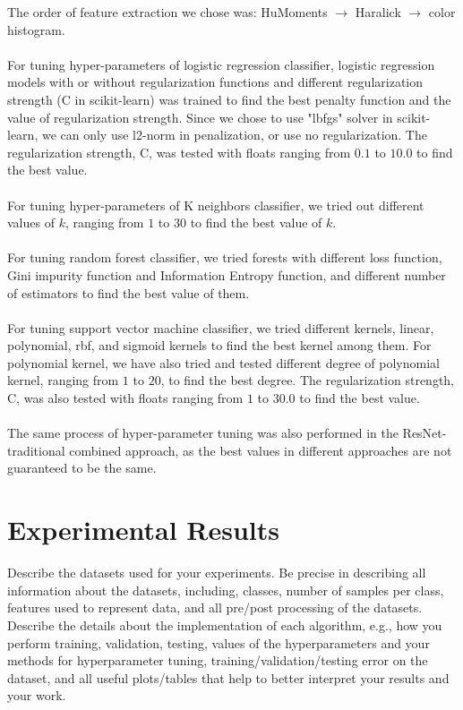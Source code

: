 \documentclass[11.5pt]{article}
\begin{document}
The order of feature extraction we chose was: HuMoments $\rightarrow$ Haralick $\rightarrow$ color histogram.\\ \\
For tuning hyper-parameters of logistic regression classifier, logistic regression models with or without regularization functions and different regularization strength (C in scikit-learn) was trained to find the best penalty function and the value of regularization strength.
Since we chose to use "lbfgs" solver in scikit-learn, we can only use l2-norm in penalization, or use no regularization.
The regularization strength, C, was tested with floats ranging from $0.1$ to $10.0$ to find the best value.\\ \\
For tuning hyper-parameters of K neighbors classifier, we tried out different values of $k$, ranging from $1$ to $30$ to find the best value of $k$.\\ \\
For tuning random forest classifier, we tried forests with different loss function, Gini impurity function and Information Entropy function, and different number of estimators to find the best value of them.\\ \\
For tuning support vector machine classifier, we tried different kernels, linear, polynomial, rbf, and sigmoid kernels to find the best kernel among them.
For polynomial kernel, we have also tried and tested different degree of polynomial kernel, ranging from $1$ to $20$, to find the best degree.
The regularization strength, C, was also tested with floats ranging from $1$ to $30.0$ to find the best value.\\ \\
The same process of hyper-parameter tuning was also performed in the ResNet-traditional combined approach, as the best values in different approaches are not guaranteed to be the same.

\section{Experimental Results}
Describe the datasets used for your experiments. Be precise in describing all information about the datasets, including, classes, number of samples per class, features used to represent data, and all pre/post processing of the datasets.\\
Describe the details about the implementation of each algorithm, e.g., how you perform training, validation, testing, values of the hyperparameters and your methods for hyperparameter tuning, training/validation/testing error on the dataset, and all useful plots/tables that help to better interpret your results and your work.
\end{document}
